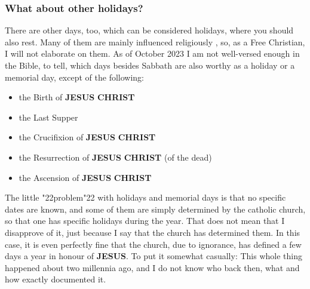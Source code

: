 \documentclass[10pt,a5paper]{article}
\newcommand{\Christ}[0]{\textbf{CHRIST}}
\newcommand{\Jesus}[0]{\textbf{JESUS}}
\newcommand{\q}[1]{\char"22{#1}\char"22 }
\begin{document}
	\subsubsection{What about other holidays?}
		There are other days,
		too,
		which can be considered holidays,
		where you should also rest.
		Many of them are mainly influenced religiously ,
		so,
		as a Free Christian,
		I will not elaborate on them.
		As of October 2023 I am not well-versed enough in the Bible,
		to tell,
		which days besides Sabbath are also worthy as a holiday
		or a memorial day,
		except of the following:
		\begin{itemize}[noitemsep]
			\item the Birth of {\Jesus} {\Christ}
			\item the Last Supper
			\item the Crucifixion of {\Jesus} {\Christ}
			\item the Resurrection of {\Jesus} {\Christ} (of the dead)
			\item the Ascension of {\Jesus} {\Christ}
		\end{itemize}
		The little \q{problem} with holidays and memorial days is that no specific dates are known,
		and some of them are simply determined by the catholic church,
		so that one has specific holidays during the year.
		That does not mean that I disapprove of it,
		just because I say that the church has determined them.
		In this case,
		it is even perfectly fine that the church,
		due to ignorance,
		has defined a few days a year in honour of {\Jesus}.
		To put it somewhat casually:
		This whole thing happened about two millennia ago,
		and I do not know
		who back then,
		what and how exactly documented it.
\end{document}
